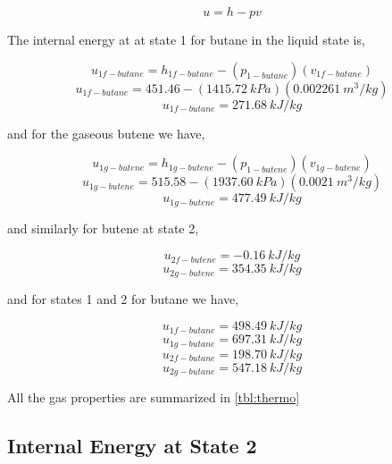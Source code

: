 \documentclass[10pt,parskip=half,
toc=sectionentrywithdots,
bibliography=totocnumbered,
captions=tableheading,numbers=noendperiod]{scrartcl}
\begin{document}
\begin{equation}u = h - pv\end{equation}

The internal energy at at state 1 for butane in the liquid state is,

\begin{equation}u_{1f-butane} = h_{1f-butane} - (p_{1-butane})(v_{1f-butane})\end{equation}
\begin{equation}u_{1f-butane} = 451.46 - (1415.72\:kPa)(0.002261\:m^3/kg)\end{equation}
\begin{equation}u_{1f-butane} = 271.68\:kJ/kg\end{equation}

and for the gaseous butene we have,

\begin{equation}u_{1g-butene} = h_{1g-butene} - (p_{1-butene})(v_{1g-butene})\end{equation}
\begin{equation}u_{1g-butene} = 515.58 - (1937.60\:kPa)(0.0021\:m^3/kg)\end{equation}
\begin{equation}u_{1g-butene} = 477.49\:kJ/kg\end{equation}

and similarly for butene at state 2,

\begin{equation}u_{2f-butene} = -0.16\:kJ/kg\end{equation}
\begin{equation}u_{2g-butene} = 354.35\:kJ/kg\end{equation}

and for states 1 and 2 for butane we have,

\begin{equation}u_{1f-butane} = 498.49\:kJ/kg\end{equation}
\begin{equation}u_{1g-butane} = 697.31\:kJ/kg\end{equation}
\begin{equation}u_{2f-butane} = 198.70\:kJ/kg\end{equation}
\begin{equation}u_{2g-butane} = 547.18\:kJ/kg\end{equation}

All the gas properties are summarized in \cref{tbl:thermo}

\hypertarget{internal-energy-at-state-2}{%
\subsection{Internal Energy at State
2}\label{internal-energy-at-state-2}}
\end{document}
